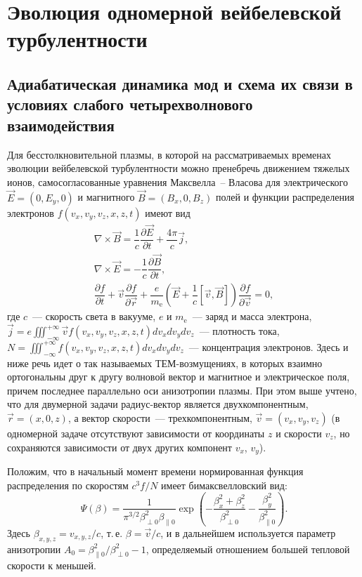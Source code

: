 \chapter{Эволюция одномерной вейбелевской турбулентности}\label{ch:ch1}
\newcommand{\me}{m_\mathrm{e}}
\newcommand{\wpl}{\omega_\mathrm{p}}
\section{Адиабатическая динамика мод и схема их связи в условиях слабого четырехволнового взаимодействия}\label{sec:ch1/sec1}

Для бесстолкновительной плазмы, в которой на рассматриваемых временах эволюции вейбелевской турбулентности можно пренебречь движением тяжелых ионов, самосогласованные уравнения  Максвелла~-- Власова для электрического $\vec{E}=(0, E_y, 0)$ и магнитного $\vec{B}=(B_x, 0, B_z)$ полей и функции распределения электронов $f(v_x , v_y , v_z, x, z, t)$ имеют вид
\begin{align}
    \nabla \times \vec{B}=\dfrac{1}{c}\dfrac{\partial \vec{E}}{\partial t}+\dfrac{4\pi}{c}\vec{j}, \\
    \nabla \times \vec{E}=-\dfrac{1}{c}\dfrac{\partial \vec{B}}{\partial t}, \\
    \dfrac{\partial f}{\partial t}+\vec{v}\dfrac{\partial f}{\partial \vec{r}}+\dfrac{e}{\me} \left(\vec{E}+\dfrac{1}{c}\left[\vec{v},\vec{B}\right]\right) \dfrac{\partial f}{\partial \vec{v}}=0,
\end{align}
где $c$~--- скорость света в вакууме, $e$ и $\me$~--- заряд и масса электрона, $\vec{j}=e\iiint^{+\infty}_{-\infty}\vec{v}f(v_x , v_y , v_z, x, z, t) dv_x dv_ydv_z$~--- плотность тока, $N=\iiint^{+\infty}_{-\infty}f(v_x , v_y , v_z , x, z, t)dv_xdv_ydv_z$~--- концентрация электронов. Здесь и ниже речь идет о так называемых ТЕМ-возмущениях, в которых взаимно ортогональны друг к другу волновой вектор и магнитное и электрическое поля, причем последнее параллельно оси анизотропии плазмы. При этом выше учтено, что для двумерной задачи радиус-вектор является двухкомпонентным, $\vec{r}=(x , 0 , z)$, а вектор скорости~--- трехкомпонентным,  $\vec{v}=(v_x , v_y ,v_z)$ (в одномерной задаче отсутствуют зависимости от координаты $z$ и скорости $v_z$, но сохраняются зависимости от двух других компонент $v_x$, $v_y$). 

Положим, что в начальный момент времени нормированная функция распределения по скоростям $c^3f/N$ имеет бимаксвелловский вид:
\begin{equation}
\label{bimax}
\Psi(\beta)=\dfrac{1}{\pi^{3/2}\beta_{\perp0}^2 \beta_{\|0} } \exp\left(-\dfrac{\beta_x^2+\beta_z^2}{\beta_{\perp0}^2}-\dfrac{\beta_y^2}{\beta_{\|0}^2}\right).
\end{equation}
Здесь $\beta_{x,y,z}={v_{x,y,z}}/{c}$, т.\,е. $\beta=\vec{v}/{c}$, и в дальнейшем используется параметр анизотропии $A_0={\beta^2_{\|0}}/{\beta^2_{\perp0}}-1$, определяемый отношением большей тепловой скорости к меньшей.

